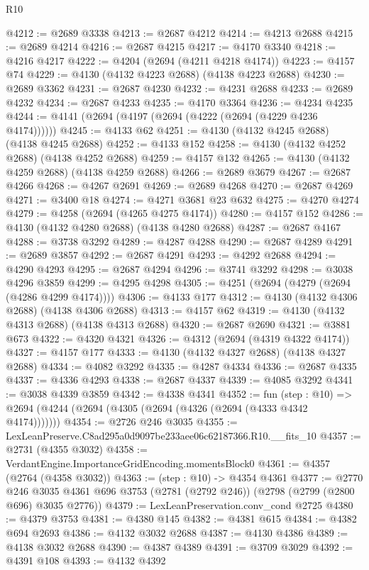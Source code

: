 \begin{lexlean}{R10}
\begin{coremodule}
@4212 := @2689 @3338
@4213 := @2687 @4212
@4214 := @4213 @2688
@4215 := @2689 @4214
@4216 := @2687 @4215
@4217 := @4170 @3340
@4218 := @4216 @4217
@4222 := @4204 (@2694 (@4211 @4218 @4174))
@4223 := @4157 @74
@4229 := @4130 (@4132 @4223 @2688) (@4138 @4223 @2688)
@4230 := @2689 @3362
@4231 := @2687 @4230
@4232 := @4231 @2688
@4233 := @2689 @4232
@4234 := @2687 @4233
@4235 := @4170 @3364
@4236 := @4234 @4235
@4244 := @4141 (@2694 (@4197 (@2694 (@4222 (@2694 (@4229 @4236 @4174))))))
@4245 := @4133 @62
@4251 := @4130 (@4132 @4245 @2688) (@4138 @4245 @2688)
@4252 := @4133 @152
@4258 := @4130 (@4132 @4252 @2688) (@4138 @4252 @2688)
@4259 := @4157 @132
@4265 := @4130 (@4132 @4259 @2688) (@4138 @4259 @2688)
@4266 := @2689 @3679
@4267 := @2687 @4266
@4268 := @4267 @2691
@4269 := @2689 @4268
@4270 := @2687 @4269
@4271 := @3400 @18
@4274 := @4271 @3681 @23 @632
@4275 := @4270 @4274
@4279 := @4258 (@2694 (@4265 @4275 @4174))
@4280 := @4157 @152
@4286 := @4130 (@4132 @4280 @2688) (@4138 @4280 @2688)
@4287 := @2687 @4167
@4288 := @3738 @3292
@4289 := @4287 @4288
@4290 := @2687 @4289
@4291 := @2689 @3857
@4292 := @2687 @4291
@4293 := @4292 @2688
@4294 := @4290 @4293
@4295 := @2687 @4294
@4296 := @3741 @3292
@4298 := @3038 @4296 @3859
@4299 := @4295 @4298
@4305 := @4251 (@2694 (@4279 (@2694 (@4286 @4299 @4174))))
@4306 := @4133 @177
@4312 := @4130 (@4132 @4306 @2688) (@4138 @4306 @2688)
@4313 := @4157 @62
@4319 := @4130 (@4132 @4313 @2688) (@4138 @4313 @2688)
@4320 := @2687 @2690
@4321 := @3881 @673
@4322 := @4320 @4321
@4326 := @4312 (@2694 (@4319 @4322 @4174))
@4327 := @4157 @177
@4333 := @4130 (@4132 @4327 @2688) (@4138 @4327 @2688)
@4334 := @4082 @3292
@4335 := @4287 @4334
@4336 := @2687 @4335
@4337 := @4336 @4293
@4338 := @2687 @4337
@4339 := @4085 @3292
@4341 := @3038 @4339 @3859
@4342 := @4338 @4341
@4352 := fun (step : @10) =>
  @2694 (@4244 (@2694 (@4305 (@2694 (@4326 (@2694 (@4333 @4342 @4174)))))))
@4354 := @2726 @246 @3035
@4355 := LexLeanPreserve.C8ad295a0d9097be233aee06c62187366.R10.__fits_10
@4357 := @2731 (@4355 @3032)
@4358 := VerdantEngine.ImportanceGridEncoding.momentsBlock0
@4361 := @4357 (@2764 (@4358 @3032))
@4363 := (step : @10) -> @4354 @4361
@4377 := @2770
    @246
    @3035
    @4361
    @696
    @3753
    (@2781 (@2792 @246))
    (@2798 (@2799 (@2800 @696) @3035 @2776))
@4379 := LexLeanPreservation.conv_cond @2725
@4380 := @4379 @3753
@4381 := @4380 @145
@4382 := @4381 @615
@4384 := @4382 @694 @2693
@4386 := @4132 @3032 @2688
@4387 := @4130 @4386
@4389 := @4138 @3032 @2688
@4390 := @4387 @4389
@4391 := @3709 @3029
@4392 := @4391 @108
@4393 := @4132 @4392

\end{coremodule}
\end{lexlean}
